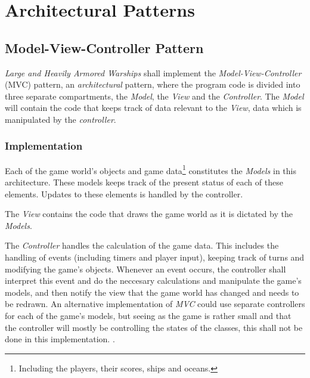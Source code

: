 \chapter{Architectural Patterns}


    \section{Model-View-Controller Pattern}
    \emph{Large and Heavily Armored Warships} shall implement the \emph{Model-View-Controller} (MVC) pattern, an \emph{architectural} pattern, where the program code is divided into three separate compartments, the \emph{Model}, the \emph{View} and the \emph{Controller}. The \emph{Model} will contain the code that keeps track of data relevant to the \emph{View}, data which is manipulated by the \emph{controller}.
    
    
    
    \subsection{Implementation}
    Each of the game world's objects and game data\footnote{Including the players, their scores, ships and oceans.} constitutes the \emph{Models} in this architecture. These models keeps track of the present status of each of these elements. Updates to these elements is handled by the controller.
    
    The \emph{View} contains the code that draws the game world as it is dictated by the \emph{Models}.
    
    The \emph{Controller} handles the calculation of the game data. This includes the handling of events (including timers and player input), keeping track of turns and modifying the game's objects.
    Whenever an event occurs, the controller shall interpret this event and do the neccesary calculations and manipulate the game's models, and then notify the view that the game world has changed and needs to be redrawn.
    An alternative implementation of \emph{MVC} could use separate controllers for each of the game's models, but seeing as the game is rather small and that the controller will mostly be controlling the states of the classes, this shall not be done in this implementation.
    .
    
